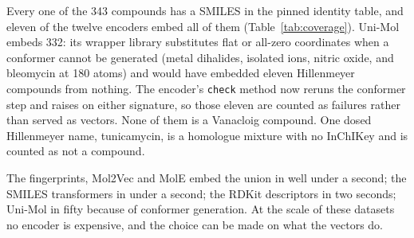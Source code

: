 Every one of the 343 compounds has a SMILES in the pinned identity table, and eleven of
the twelve encoders embed all of them (Table~\ref{tab:coverage}). Uni-Mol embeds 332:
its wrapper library substitutes flat or all-zero coordinates when a conformer cannot be
generated (metal dihalides, isolated ions, nitric oxide, and bleomycin at 180 atoms) and
would have embedded eleven Hillenmeyer compounds from nothing. The encoder's
\texttt{check} method now reruns the conformer step and raises on either signature, so
those eleven are counted as failures rather than served as vectors. None of them is a
Vanacloig compound. One dosed Hillenmeyer name, tunicamycin, is a homologue mixture
with no InChIKey and is counted as not a compound.

The fingerprints, Mol2Vec and MolE embed the union in well under a second; the SMILES
transformers in under a second; the RDKit descriptors in two seconds; Uni-Mol in fifty
because of conformer generation. At the scale of these datasets no encoder is
expensive, and the choice can be made on what the vectors do.
